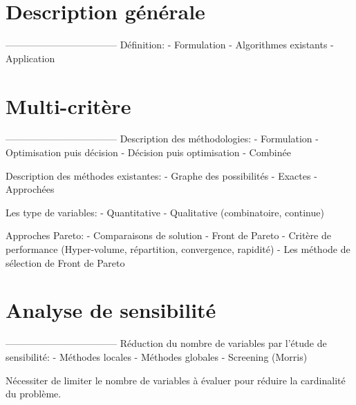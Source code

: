 
\section{Description générale} %
\label{sec:description_generale}
-----------------------------------
Définition:
 - Formulation
 - Algorithmes existants
 - Application




\section{Multi-critère} %
\label{sec:multi_critere}
-----------------------------------
Description des méthodologies:
 - Formulation
 - Optimisation puis décision
 - Décision puis optimisation
 - Combinée

Description des méthodes existantes:
 - Graphe des possibilités
 - Exactes
 - Approchées

Les type de variables:
 - Quantitative
 - Qualitative (combinatoire, continue)

Approches Pareto:
 - Comparaisons de solution
 - Front de Pareto
 - Critère de performance (Hyper-volume, répartition, convergence, rapidité)
 - Les méthode de sélection de Front de Pareto



\section{Analyse de sensibilité} %
\label{sec:analyse_de_sensibilite}
-----------------------------------
Réduction du nombre de variables par l’étude de sensibilité:
 - Méthodes locales
 - Méthodes globales
 - Screening (Morris)

Nécessiter de limiter le nombre de variables à évaluer pour réduire la cardinalité
du problème.

